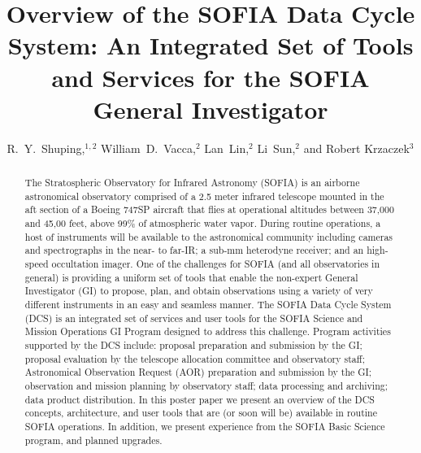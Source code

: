
\resetcounters


\title{Overview of the SOFIA Data Cycle System:  An Integrated Set of Tools and Services for the SOFIA General Investigator}
\author{R.~Y.~Shuping,$^{1,2}$ William~D.~Vacca,$^2$ Lan~Lin,$^2$ Li~Sun,$^2$ and Robert Krzaczek$^3$
}



\begin{abstract}
The Stratospheric Observatory for Infrared Astronomy (SOFIA) is an airborne astronomical observatory comprised of a 2.5 meter infrared telescope mounted in the aft section of a Boeing 747SP aircraft that flies at operational altitudes between 37,000 and 45,00 feet, above 99\% of atmospheric water vapor. During routine operations, a host of instruments will be available to the astronomical community including cameras and  spectrographs in the near- to far-IR; a sub-mm heterodyne receiver; and an high-speed occultation imager. One of the challenges for SOFIA (and all observatories in general) is providing a uniform set of tools that enable the non-expert General Investigator (GI) to propose, plan, and obtain observations using a variety of very different instruments in an easy and seamless manner. The SOFIA Data Cycle System (DCS) is an integrated set of services and user tools for the SOFIA Science and Mission Operations GI Program designed to address this challenge. Program activities supported by the DCS include:  
proposal preparation and submission by the GI; 
proposal evaluation by the telescope allocation committee and observatory staff;
 Astronomical Observation Request (AOR) preparation and submission by the GI;
 observation and mission planning by observatory staff;
 data processing and archiving;
 data product distribution.
In this poster paper we present an overview of the DCS concepts, architecture, and user tools that are (or soon will be) available in routine SOFIA operations. In addition, we present experience from the SOFIA Basic Science program, and planned upgrades.
\end{abstract}

